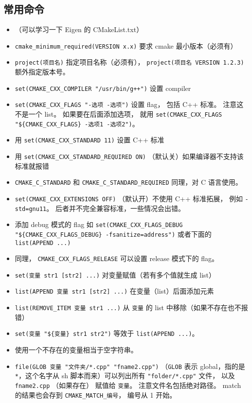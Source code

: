 \subsection{常用命令}
\begin{itemize}
\item （可以学习一下 Eigen 的 CMakeList.txt）
\item \verb`cmake_minimum_required(VERSION x.x)` 要求 cmake 最小版本（必须有）
\item \verb`project(项目名)` 指定项目名称（必须有）， \verb`project(项目名 VERSION 1.2.3)` 额外指定版本号。
\item \verb`set(CMAKE_CXX_COMPILER "/usr/bin/g++")` 设置 compiler
\item \verb`set(CMAKE_CXX_FLAGS "-选项 -选项")` 设置 flag， 包括 C++ 标准。 注意这不是一个 list。 如果要在后面添加选项， 就用 \verb`set(CMAKE_CXX_FLAGS "${CMAKE_CXX_FLAGS} -选项1 -选项2")`。
\item 用 \verb`set(CMAKE_CXX_STANDARD 11)` 设置 C++ 标准
\item 用 \verb`set(CMAKE_CXX_STANDARD_REQUIRED ON)` （默认关）如果编译器不支持该标准就报错
\item \verb`CMAKE_C_STANDARD` 和 \verb`CMAKE_C_STANDARD_REQUIRED` 同理，对 C 语言使用。
\item \verb`set(CMAKE_CXX_EXTENSIONS OFF)` （默认开）不使用 C++ 标准拓展， 例如 \verb`-std=gnu11`。 后者并不完全兼容标准，一些情况会出错。
\item 添加 debug 模式的 flag 如 \verb`set(CMAKE_CXX_FLAGS_DEBUG "${CMAKE_CXX_FLAGS_DEBUG} -fsanitize=address")` 或者下面的 \verb`list(APPEND ...)`
\item 同理， \verb`CMAKE_CXX_FLAGS_RELEASE` 可以设置 release 模式下的 flag。
\item \verb`set(变量 str1 [str2] ...)` 对变量赋值（若有多个值就生成 list）
\item \verb`list(APPEND 变量 str1 [str2] ...)` 在变量（list）后面添加元素
\item \verb`list(REMOVE_ITEM 变量 str1 ...)` 从 \verb`变量` 的 list 中移除（如果不存在也不报错）
\item \verb`set(变量 "${变量} str1 str2")` 等效于 \verb`list(APPEND ...)`。
\item 使用一个不存在的变量相当于空字符串。
\item \verb`file(GLOB 变量 "文件夹/*.cpp" "fname2.cpp")` （\verb`GLOB` 表示 global，指的是 \verb`*`，这个名字从 sh 脚本而来）可以列出所有 \verb`"folder/*.cpp"` 文件， 以及 \verb`fname2.cpp` （如果存在） 赋值给 \verb`变量`。 注意文件名包括绝对路径。 match 的结果也会存到 \verb`CMAKE_MATCH_编号`， 编号从 1 开始。

\end{itemize}

